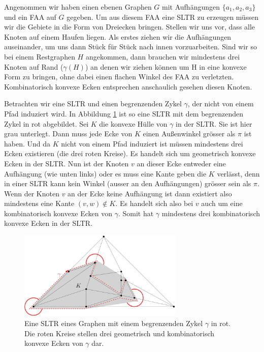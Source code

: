 \begin{remark}
Angenommen wir haben einen ebenen Graphen $G$ mit Aufhängungen $\{a_1,a_2,a_3\}$ und ein FAA auf $G$ gegeben. Um aus diesem FAA eine SLTR zu erzeugen müssen wir die Gebiete in die Form von Dreiecken bringen. Stellen wir uns vor, dass alle Knoten auf einem Haufen liegen. Als erstes \glqq ziehen\grqq{ } wir die Aufhängungen auseinander, um uns dann Stück für Stück nach innen vorzuarbeiten. Sind wir so bei einem Restgraphen $H$ angekommen, dann brauchen wir mindestens drei Knoten auf Rand ($\gamma(H)$) an denen wir \glqq ziehen\grqq{ } können um H in eine konvexe Form zu bringen, ohne dabei einen flachen Winkel des FAA zu verletzten. Kombinatorisch konvexe Ecken entsprechen anschaulich gesehen diesen Knoten.
\end{remark}

\begin{example}
Betrachten wir eine SLTR und einen begrenzenden Zykel $\gamma$, der nicht von einem Pfad induziert wird. In Abbildung \ref{pic_exp_cycle} ist so eine SLTR mit dem begrenzenden Zykel in rot abgebildet. Sei $K$ die konvexe Hülle von $\gamma$ in der SLTR. Sie ist hier grau unterlegt. Dann muss jede Ecke von $K$ einen Außenwinkel grösser als $\pi$ ist haben. Und da $K$ nicht von einem Pfad induziert ist müssen mindestens drei Ecken existieren (die drei roten Kreise). Es handelt sich um geometrisch konvexe Ecken in der SLTR. Nun ist der Knoten $v$ an dieser Ecke entweder eine Aufhängung (wie unten links) oder es muss eine Kante geben die $K$ verlässt, denn in einer SLTR kann kein Winkel (ausser an den Aufhängungen) grösser sein als $\pi$. Wenn der Knoten $v$ an der Ecke keine Aufhängung ist dann existiert also mindestens eine Kante $(v,w) \notin K$. Es handelt sich also bei $v$ auch um eine kombinatorisch konvexe Ecken von $\gamma$. Somit hat $\gamma$ mindestens drei kombinatorisch konvexe Ecken in der SLTR. 
\end{example}

\begin{figure}[h]
	\centering
  \includegraphics[width=0.7\textwidth]{exp_cycle.png}
  \caption{Eine SLTR eines Graphen mit einem begrenzenden Zykel $\gamma$ in rot. Die roten Kreise stellen drei geometrisch und kombinatorisch konvexe Ecken von $\gamma$ dar.}
  \label{pic_exp_cycle}
\end{figure}

